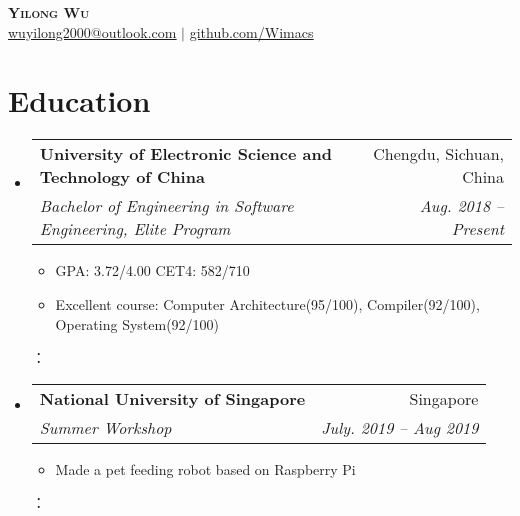 \documentclass[letterpaper,11pt]{article}
\makeatletter
\newcommand{\resumeItem}[1]{
  \item\small{
    {#1 \vspace{-2pt}}
  }
}
\newcommand{\resumeSubheading}[4]{
  \vspace{-2pt}\item
    \begin{tabular*}{0.97\textwidth}[t]{l@{\extracolsep{\fill}}r}
      \textbf{#1} & #2 \\
      \textit{\small#3} & \textit{\small #4} \\
    \end{tabular*}\vspace{-7pt}
}
\newcommand{\resumeSubHeadingListStart}{\begin{itemize}[leftmargin=0.15in, label={}]}
\newcommand{\resumeSubHeadingListEnd}{\end{itemize}}
\newcommand{\resumeItemListStart}{\begin{itemize}}
\newcommand{\resumeItemListEnd}{\end{itemize}\vspace{-5pt}}
\makeatother
\begin{document}

\begin{center}
    \textbf{\Huge \scshape Yilong Wu} \\ \vspace{1pt}
     \href{mailto:wuyilong2000@outlook.com}{\underline{wuyilong2000@outlook.com}} $|$ 
    \href{https://github.com/Wimacs}{\underline{github.com/Wimacs}}
\end{center}


\section{Education}
  \resumeSubHeadingListStart
    \resumeSubheading
      {University of Electronic Science and Technology of China}{Chengdu, Sichuan, China}
      {Bachelor of Engineering in Software Engineering, Elite Program }{Aug. 2018 -- Present}
      \resumeItemListStart
      	\resumeItem{GPA: 3.72/4.00 CET4: 582/710}
        \resumeItem{Excellent course: Computer Architecture(95/100), Compiler(92/100), Operating System(92/100)}
       \resumeItemListEnd：
    \resumeSubheading
      {National University of Singapore}{Singapore }
      {Summer Workshop}{July. 2019 -- Aug 2019}
       \resumeItemListStart
      	\resumeItem{Made a pet feeding robot based on Raspberry Pi}
       \resumeItemListEnd：
  \resumeSubHeadingListEnd




\end{document}
